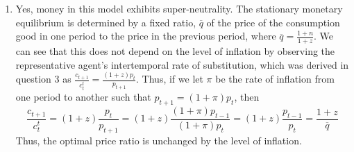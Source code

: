 \documentclass{article}
\begin{document}
\begin{enumerate}
	\item Yes, money in this model exhibits super-neutrality. The stationary monetary equilibrium is determined by a fixed ratio, $\overline{q}$ of the price of the consumption good in one period to the price in the previous period, where $\overline{q}=\frac{1+n}{1+z}$. We can see that this does not depend on the level of inflation by observing the representative agent's intertemporal rate of substitution, which was derived in question 3 as $\frac{c_{t+1}}{c_t^t} = \frac{(1+z)p_t}{p_{t+1}}$. Thus, if we let $\pi$ be the rate of inflation from one period to another such that $p_{t+1}=(1+\pi)p_t$, then
		\[
			\frac{c_{t+1}}{c_t^t} = (1+z)\frac{p_t}{p_{t+1}} = (1+z)\frac{(1+\pi)p_{t-1}}{(1+\pi)p_{t}} =  (1+z)\frac{p_{t-1}}{p_{t}} = \frac{1+z}{\overline{q}}
		\]
		Thus, the optimal price ratio is unchanged by the level of inflation.
	
\end{enumerate}


\end{document}
